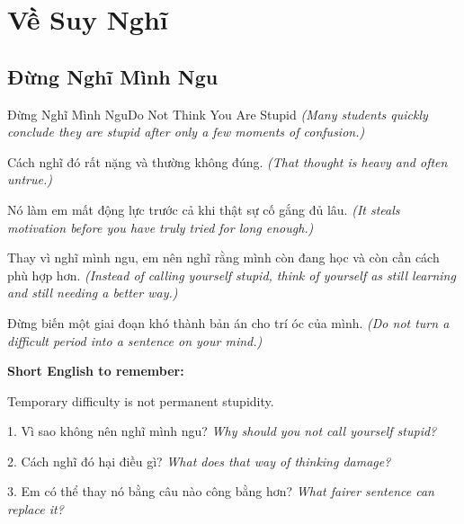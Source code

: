 \chapter{Về Suy Nghĩ}

\section{Đừng Nghĩ Mình Ngu}
\begin{truyen}{Đừng Nghĩ Mình Ngu}{Do Not Think You Are Stupid}
\textit{(Many students quickly conclude they are stupid after only a few moments of confusion.)}

Cách nghĩ đó rất nặng và thường không đúng.
\textit{(That thought is heavy and often untrue.)}

Nó làm em mất động lực trước cả khi thật sự cố gắng đủ lâu.
\textit{(It steals motivation before you have truly tried for long enough.)}

Thay vì nghĩ mình ngu, em nên nghĩ rằng mình còn đang học và còn cần cách phù hợp hơn.
\textit{(Instead of calling yourself stupid, think of yourself as still learning and still needing a better way.)}
\end{truyen}

\begin{baihoc}
Đừng biến một giai đoạn khó thành bản án cho trí óc của mình.
\textit{(Do not turn a difficult period into a sentence on your mind.)}
\end{baihoc}

\begin{ghinhoanh}
\textbf{Short English to remember:}

Temporary difficulty is not permanent stupidity.

\end{ghinhoanh}

\begin{tuhocnhanh}
1. Vì sao không nên nghĩ mình ngu? \textit{Why should you not call yourself stupid?}

2. Cách nghĩ đó hại điều gì? \textit{What does that way of thinking damage?}

3. Em có thể thay nó bằng câu nào công bằng hơn? \textit{What fairer sentence can replace it?}
\end{tuhocnhanh}
\ngancach


